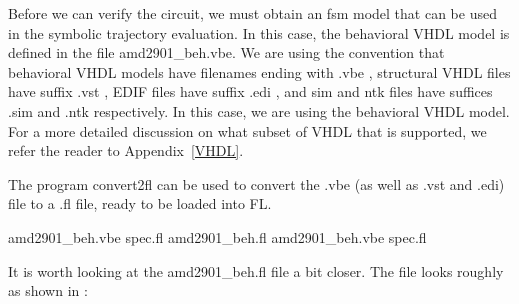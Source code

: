 Before we can verify the circuit, we must obtain an fsm model that
can be used in the symbolic trajectory evaluation.
In this case, the behavioral VHDL model is defined in the file amd2901\_beh.vbe.
We are using the convention that behavioral VHDL%
%
{} models have filenames
ending with .vbe%
%
{}, structural VHDL files have suffix .vst%
%
{}, EDIF%
%
{} files
have suffix .edi%
%
{}, and sim%
%
{} and ntk%
%
{} files have suffices .sim%
%
{} and .ntk%
%
{}
respectively.
In this case, we are using the behavioral VHDL model.
For a more detailed discussion on what subset of VHDL that is
supported, we refer the reader to Appendix~\ref{VHDL}.

The program convert2fl%
%
{} can be used to convert the .vbe
(as well as .vst and .edi) file to a .fl file, ready to be loaded
into FL.
\begin{hol}
amd2901\_beh.vbe  spec.fl
amd2901\_beh.fl   amd2901\_beh.vbe  spec.fl
\end{hol}

It is worth looking at the amd2901\_beh.fl file a bit closer.
The file looks roughly as shown in :

